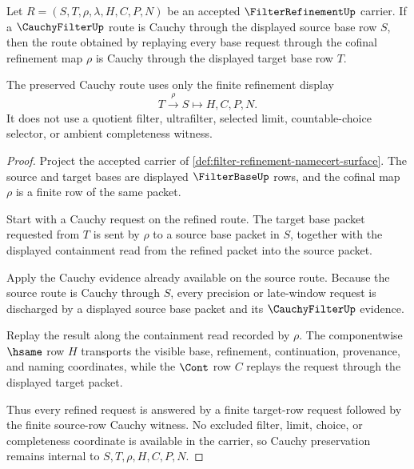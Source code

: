 \begin{theorem}
\label{thm:filter-refinement-cauchy-preservation}
Let $R=(S,T,\rho,\lambda,H,C,P,N)$ be an accepted $\FilterRefinementUp$ carrier. If a $\CauchyFilterUp$ route is Cauchy through the displayed source base row $S$, then the route obtained by replaying every base request through the cofinal refinement map $\rho$ is Cauchy through the displayed target base row $T$.

The preserved Cauchy route uses only the finite refinement display
$$
T \xrightarrow{\rho} S \longmapsto H,C,P,N .
$$
It does not use a quotient filter, ultrafilter, selected limit, countable-choice selector, or ambient completeness witness.
\end{theorem}
\begin{proof}
Project the accepted carrier of \autoref{def:filter-refinement-namecert-surface}. The source and target bases are displayed $\FilterBaseUp$ rows, and the cofinal map $\rho$ is a finite row of the same packet.

Start with a Cauchy request on the refined route. The target base packet requested from $T$ is sent by $\rho$ to a source base packet in $S$, together with the displayed containment read from the refined packet into the source packet.

Apply the Cauchy evidence already available on the source route. Because the source route is Cauchy through $S$, every precision or late-window request is discharged by a displayed source base packet and its $\CauchyFilterUp$ evidence.

Replay the result along the containment read recorded by $\rho$. The componentwise $\hsame$ row $H$ transports the visible base, refinement, continuation, provenance, and naming coordinates, while the $\Cont$ row $C$ replays the request through the displayed target packet.

Thus every refined request is answered by a finite target-row request followed by the finite source-row Cauchy witness. No excluded filter, limit, choice, or completeness coordinate is available in the carrier, so Cauchy preservation remains internal to $S,T,\rho,H,C,P,N$.
\end{proof}

